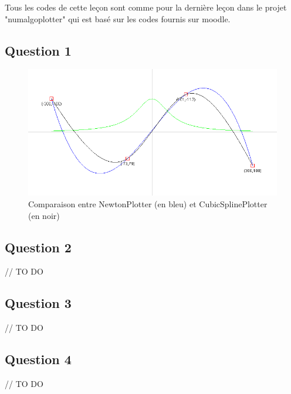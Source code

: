 Tous les codes de cette leçon sont comme pour la dernière leçon dans le projet "numalgoplotter" qui est basé sur les codes fournis sur moodle. 

\subsection{Question 1}


\begin{figure}[H]
	\centering
	\caption{\label{comparaison} Comparaison entre NewtonPlotter (en bleu) et CubicSplinePlotter (en noir)}
	\includegraphics[scale = 0.4]{7_comparaisonNewtonCubic.png}
\end{figure}

\subsection{Question 2}

// TO DO


\subsection{Question 3}

// TO DO


\subsection{Question 4}

// TO DO